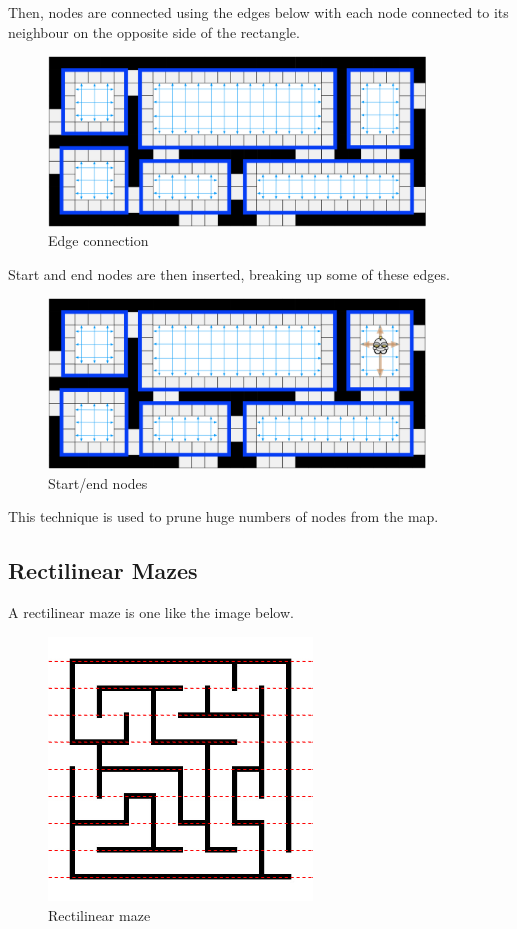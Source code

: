 \documentclass[titlepage]{article}
\begin{document}
Then, nodes are connected using the edges below with each node connected to its neighbour on the opposite side of the rectangle.

\begin{figure}[H]
  \centering
  \includegraphics[width=10cm]{rsr2.png}
  \caption{Edge connection}
  \label{fig:boat1}
\end{figure}

Start and end nodes are then inserted, breaking up some of these edges. 

\begin{figure}[H]
  \centering
  \includegraphics[width=10cm]{rsr3.png}
  \caption{Start/end nodes}
  \label{fig:boat1}
\end{figure}

This technique is used to prune huge numbers of nodes from the map. \cite{rsr}

\subsection{Rectilinear Mazes}

A rectilinear maze is one like the image below. 

\begin{figure}[H]
  \centering
  \includegraphics[width=7cm]{standard.jpg}
  \caption{Rectilinear maze}
  \label{fig:boat1}
\end{figure}
\end{document}
